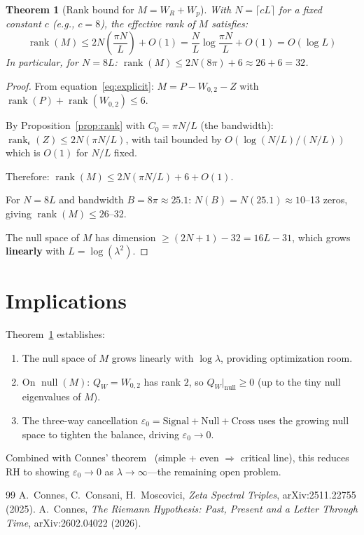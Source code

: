 \documentclass[11pt]{article}
\newtheorem{theorem}{Theorem}
\begin{document}
\begin{theorem}[Rank bound for $M = W_R + W_p$]\label{thm:main}
With $N = \lceil cL \rceil$ for a fixed constant $c$ (e.g., $c = 8$), the effective rank of $M$ satisfies:
\[
\operatorname{rank}(M) \leq 2N\!\left(\frac{\pi N}{L}\right) + O(1) = \frac{N}{L}\log\frac{\pi N}{L} + O(1) = O(\log L)
\]
In particular, for $N = 8L$: $\operatorname{rank}(M) \leq 2N(8\pi) + 6 \approx 26 + 6 = 32$.
\end{theorem}

\begin{proof}
From equation~\eqref{eq:explicit}: $M = P - W_{0,2} - Z$ with $\operatorname{rank}(P) + \operatorname{rank}(W_{0,2}) \leq 6$.

By Proposition~\ref{prop:rank} with $C_0 = \pi N/L$ (the bandwidth): $\operatorname{rank}_\epsilon(Z) \leq 2N(\pi N/L)$, with tail bounded by $O(\log(N/L)/(N/L))$ which is $O(1)$ for $N/L$ fixed.

Therefore: $\operatorname{rank}(M) \leq 2N(\pi N/L) + 6 + O(1)$.

For $N = 8L$ and bandwidth $B = 8\pi \approx 25.1$: $N(B) = N(25.1) \approx 10$--13 zeros, giving $\operatorname{rank}(M) \leq 26$--32.

The null space of $M$ has dimension $\geq (2N+1) - 32 = 16L - 31$, which grows \textbf{linearly} with $L = \log(\lambda^2)$.
\end{proof}

\section{Implications}

Theorem~\ref{thm:main} establishes:
\begin{enumerate}
\item The null space of $M$ grows linearly with $\log\lambda$, providing optimization room.
\item On $\operatorname{null}(M)$: $Q_W = W_{0,2}$ has rank $2$, so $Q_W|_{\operatorname{null}} \geq 0$ (up to the tiny null eigenvalues of $M$).
\item The three-way cancellation $\varepsilon_0 = \mathrm{Signal} + \mathrm{Null} + \mathrm{Cross}$ uses the growing null space to tighten the balance, driving $\varepsilon_0 \to 0$.
\end{enumerate}

Combined with Connes' theorem~\cite{Connes2026} (simple + even $\Rightarrow$ critical line), this reduces RH to showing $\varepsilon_0 \to 0$ as $\lambda \to \infty$---the remaining open problem.

\begin{thebibliography}{99}
 A.~Connes, C.~Consani, H.~Moscovici, \emph{Zeta Spectral Triples}, arXiv:2511.22755 (2025).
 A.~Connes, \emph{The Riemann Hypothesis: Past, Present and a Letter Through Time}, arXiv:2602.04022 (2026).
\end{thebibliography}
\end{document}
